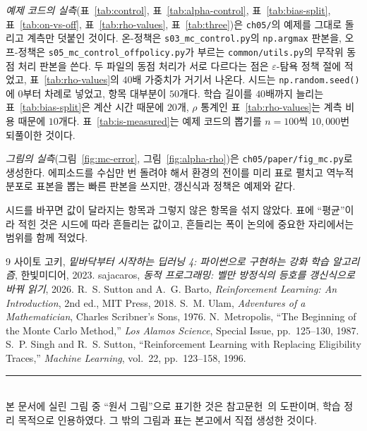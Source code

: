 \documentclass[11pt,a4paper]{article}
\begin{document}
\emph{예제 코드의 실측}(표~\ref{tab:control}, 표~\ref{tab:alpha-control},
표~\ref{tab:bias-split}, 표~\ref{tab:on-vs-off}, 표~\ref{tab:rho-values},
표~\ref{tab:three})은 \texttt{ch05/}의 예제를 그대로 돌리고 계측만 덧붙인 것이다. 온-정책은 \texttt{s03\_mc\_control.py}의 \lstinline|np.argmax| 판본을, 오프-정책은
\texttt{s05\_mc\_control\_offpolicy.py}가 부르는 \texttt{common/utils.py}의 무작위 동점 처리
판본을 쓴다. 두 파일의 동점 처리가 서로 다르다는 점은 $\varepsilon$-탐욕 정책 절에 적었고,
표~\ref{tab:rho-values}의 $40$배 가중치가 거기서 나온다. 시드는 \lstinline|np.random.seed()|에 $0$부터 차례로 넣었고, 항목 대부분이 $50$개다.
학습 길이를 $40$배까지 늘리는 표~\ref{tab:bias-split}은 계산 시간 때문에 $20$개,
$\rho$ 통계인 표~\ref{tab:rho-values}는 계측 비용 때문에 $10$개다.
표~\ref{tab:is-measured}는 예제 코드의 뽑기를 $n=100$씩 $10{,}000$번 되풀이한 것이다.

\emph{그림의 실측}(그림~\ref{fig:mc-error}, 그림~\ref{fig:alpha-rho})은
\texttt{ch05/paper/fig\_mc.py}로 생성한다. 에피소드를 수십만 번 돌려야 해서 환경의 전이를 미리 표로
펼치고 역누적분포로 표본을 뽑는 빠른 판본을 쓰지만, 갱신식과 정책은 예제와 같다.

시드를 바꾸면 값이 달라지는 항목과 그렇지 않은 항목을 섞지 않았다. 표에 ``평균''이라 적힌 것은
시드에 따라 흔들리는 값이고, 흔들리는 폭이 논의에 중요한 자리에서는 범위를 함께 적었다.

\begin{thebibliography}{9}
사이토 고키, \emph{밑바닥부터 시작하는 딥러닝 4: 파이썬으로 구현하는 강화 학습 알고리즘}, 한빛미디어, 2023.
sajacaros, \emph{동적 프로그래밍: 벨만 방정식의 등호를 갱신식으로 바꿔 읽기}, 2026.
R.~S. Sutton and A.~G. Barto, \emph{Reinforcement Learning: An Introduction}, 2nd ed., MIT Press, 2018.
S.~M. Ulam, \emph{Adventures of a Mathematician}, Charles Scribner's Sons, 1976.
N.~Metropolis, ``The Beginning of the Monte Carlo Method,'' \emph{Los Alamos Science}, Special Issue, pp.~125--130, 1987.
S.~P. Singh and R.~S. Sutton, ``Reinforcement Learning with Replacing Eligibility Traces,''
\emph{Machine Learning}, vol.~22, pp.~123--158, 1996.
\end{thebibliography}

\vspace{4mm}
\noindent\rule{\linewidth}{0.4pt}\\
\footnotesize
본 문서에 실린 그림 중 ``원서 그림''으로 표기한 것은 참고문헌~\cite{dlfs4}의 도판이며, 학습 정리 목적으로
인용하였다. 그 밖의 그림과 표는 본고에서 직접 생성한 것이다.
\end{document}
